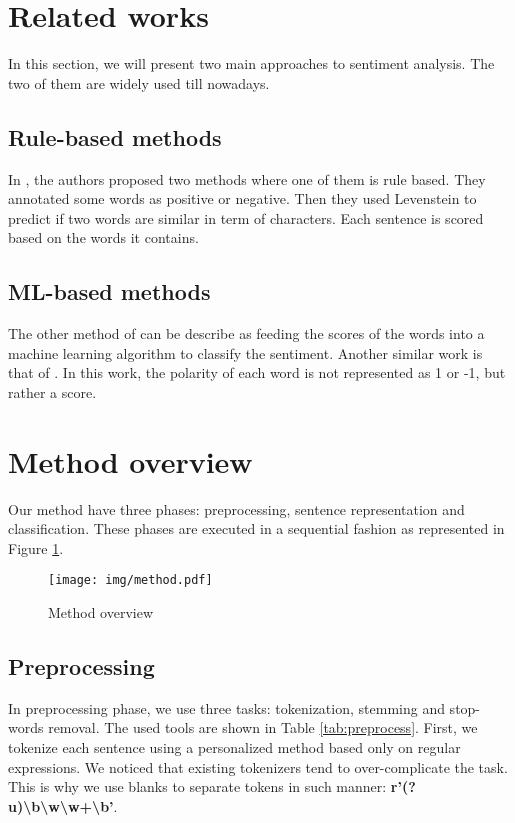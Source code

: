 \documentclass[conference]{IEEEtran}
\begin{document}
\section{Related works}

In this section, we will present two main approaches to sentiment analysis.
The two of them are widely used till nowadays.

\subsection{Rule-based methods}

In \cite{18-bettiche-al}, the authors proposed two methods where one of them is rule based.
They annotated some words as positive or negative.
Then they used Levenstein to predict if two words are similar in term of characters. 
Each sentence is scored based on the words it contains.

\subsection{ML-based methods}

The other method of \cite{18-bettiche-al} can be describe as feeding the scores of the words into a machine learning algorithm to classify the sentiment.
Another similar work is that of \cite{18-guellil-al}.
In this work, the polarity of each word is not represented as 1 or -1, but rather a score.

\section{Method overview}

Our method have three phases: preprocessing, sentence representation and classification.
These phases are executed in a sequential fashion as represented in Figure \ref{fig:method}.
\begin{figure}[htbp]
\centerline{\texttt{[image: img/method.pdf]}}
\caption{Method overview}
\label{fig:method}
\end{figure}

\subsection{Preprocessing}

In preprocessing phase, we use three tasks: tokenization, stemming and stop-words removal. 
The used tools are shown in Table \ref{tab:preprocess}. 
First, we tokenize each sentence using a personalized method based only on regular expressions.
We noticed that existing tokenizers tend to over-complicate the task.
This is why we use blanks to separate tokens in such manner: \textbf{r'(?u)\textbackslash b\textbackslash w\textbackslash w+\textbackslash b'}.
\end{document}
